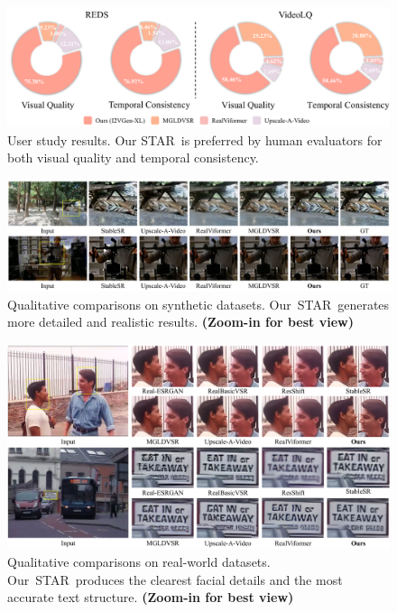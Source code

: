 \documentclass[10pt,twocolumn,letterpaper,table]{article}
\newcommand{\name}{STAR}
\begin{document}
\begin{figure}[]
    \centering
    \includegraphics[width=\linewidth]{figure_of_supp/user_study.pdf}
    \caption{User study results. Our \name\ is preferred by human evaluators for both visual quality and temporal consistency.}
    \label{fig:user_study}
\end{figure}


\begin{figure}
    \centering
    \includegraphics[width=1\linewidth]{figure_of_supp/synthetic.pdf}
    \caption{Qualitative comparisons on synthetic datasets. Our~\name~generates more detailed and realistic results. \textbf{(Zoom-in for best view)}}
    \label{fig:synthetic_comparison}
\end{figure}

\begin{figure}
    \centering
    \includegraphics[width=1\linewidth]{figure_of_supp/real_world.pdf}
    \caption{Qualitative comparisons on real-world datasets. Our~\name~produces the clearest facial details and the most accurate text structure. \textbf{(Zoom-in for best view)}}
    \label{fig:realworld_comparison}
\end{figure}
\end{document}
